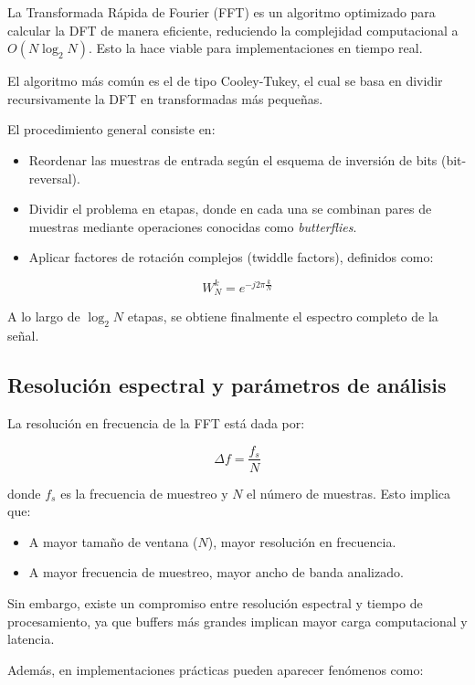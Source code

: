 \documentclass[12pt]{article}
\begin{document}
			La Transformada Rápida de Fourier (FFT) es un algoritmo optimizado para calcular la DFT de manera eficiente, reduciendo la complejidad computacional a $O(N \log_2 N)$. Esto la hace viable para implementaciones en tiempo real.

			El algoritmo más común es el de tipo Cooley-Tukey, el cual se basa en dividir recursivamente la DFT en transformadas más pequeñas.

			El procedimiento general consiste en:

			\begin{itemize}
				\item Reordenar las muestras de entrada según el esquema de inversión de bits (bit-reversal).
				\item Dividir el problema en etapas, donde en cada una se combinan pares de muestras mediante operaciones conocidas como \textit{butterflies}.
				\item Aplicar factores de rotación complejos (twiddle factors), definidos como:
			\end{itemize}

			\[
			W_N^k = e^{-j 2\pi \frac{k}{N}}
			\]

			\noindent
			A lo largo de $\log_2 N$ etapas, se obtiene finalmente el espectro completo de la señal.

		\subsection{Resolución espectral y parámetros de análisis}

			La resolución en frecuencia de la FFT está dada por:

			\[
			\Delta f = \frac{f_s}{N}
			\]
		
			donde $f_s$ es la frecuencia de muestreo y $N$ el número de muestras. Esto implica que:

			\begin{itemize} 
				\item A mayor tamaño de ventana ($N$), mayor resolución en frecuencia.
				\item A mayor frecuencia de muestreo, mayor ancho de banda analizado.
			\end{itemize}

			Sin embargo, existe un compromiso entre resolución espectral y tiempo de procesamiento, ya que buffers más grandes implican mayor carga computacional y latencia.

			Además, en implementaciones prácticas pueden aparecer fenómenos como:
\end{document}
